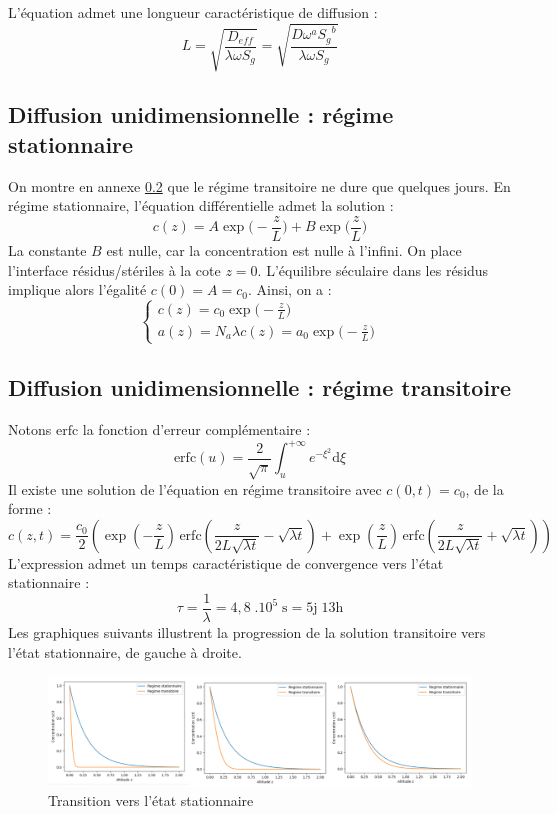 \documentclass{article}
\begin{document}
L’équation admet une longueur caractéristique de diffusion :
$$
L=\sqrt{\frac{D_{eff}}{\lambda \omega S_g }}=\sqrt{\frac{D \omega^a {S_g}^b}{\lambda \omega S_g }}
$$

\subsection{Diffusion unidimensionnelle : régime stationnaire}
\label{annexe:reg_stat}

On montre en annexe \ref{annexe:reg_trans} que le régime transitoire ne dure que quelques jours. En régime stationnaire, l’équation différentielle admet la solution :
$$
c(z)=A \exp \Big(-\frac{z}{L} \Big)+B \exp \Big( \frac{z}{L} \Big)
$$
La constante $B$ est nulle, car la concentration est nulle à l’infini. On place l’interface résidus/stériles à la cote $z=0$. L’équilibre séculaire dans les résidus implique alors l’égalité $c(0)=A=c_0$. Ainsi, on a :
$$
\left\{ \begin{array}{cl}
c(z)=c_0 \exp\Big(-\frac{z}{L}\Big) \\
a(z)=N_a \lambda c(z) =a_0 \exp\Big(-\frac{z}{L}\Big)
\end{array} \right.
$$

\subsection{Diffusion unidimensionnelle : régime transitoire}
\label{annexe:reg_trans}

Notons $\text{erfc}$ la fonction d’erreur complémentaire :
$$
\text{erfc}(u)=\frac{2}{\sqrt{\pi}} \int_{u}^{+\infty } e^{-\xi^2} \text{d}\xi
$$
Il existe une solution de l’équation en régime transitoire avec $c(0,t)=c_0$, de la forme :
$$
c(z,t)=\frac{c_0}{2} \left( \exp\!\left(-\frac{z}{L}\right) \, \text{erfc}\!\left(\frac{z}{2L\sqrt{ \lambda t}} - \sqrt{\lambda t}\right) + \exp\!\left(\frac{z}{L}\right) \, \text{erfc}\!\left(\frac{z}{2L\sqrt{\lambda t}} + \sqrt{\lambda t} \right) \right)
$$
L’expression admet un temps caractéristique de convergence vers l’état stationnaire :
$$
\tau=\frac{1}{\lambda}=4,8 \; .10^5 \; \text{s}=5\text{j} \; 13\text{h}
$$
Les graphiques suivants illustrent la progression de la solution transitoire vers l'état stationnaire, de gauche à droite.
\begin{figure}[H]
    \centering
    \includegraphics[width = \linewidth]{III_C_3.png}
    \caption{Transition vers l'état stationnaire}
    \label{fig:diffusion_transitoire}
\end{figure}
\end{document}

